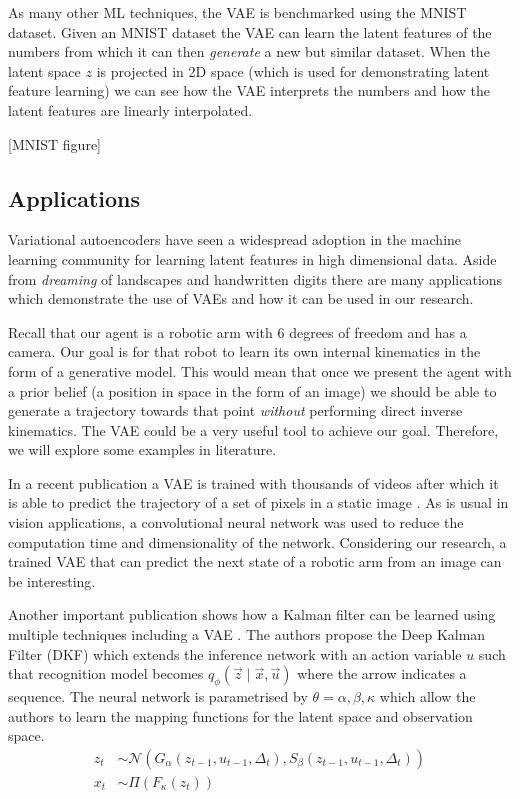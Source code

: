 \documentclass[main.tex]{subfiles}
\begin{document}
As many other ML techniques, the VAE is benchmarked using the MNIST dataset. Given an MNIST dataset the VAE can learn the latent features of the numbers from which it can then \textit{generate} a new but similar dataset. When the latent space $z$ is projected in 2D space (which is used for demonstrating latent feature learning) we can see how the VAE interprets the numbers and how the latent features are linearly interpolated.

[MNIST figure]

\subsection{Applications}
Variational autoencoders have seen a widespread adoption in the machine learning community for learning latent features in high dimensional data. Aside from \textit{dreaming} of landscapes and handwritten digits there are many applications which demonstrate the use of VAEs and how it can be used in our research.

Recall that our agent is a robotic arm with 6 degrees of freedom and has a camera. Our goal is for that robot to learn its own internal kinematics in the form of a generative model. This would mean that once we present the agent with a prior belief (a position in space in the form of an image) we should be able to generate a trajectory towards that point \textit{without} performing direct inverse kinematics. The VAE could be a very useful tool to achieve our goal. Therefore, we will explore some examples in literature. 

In a recent publication a VAE is trained with thousands of videos after which it is able to predict the trajectory of a set of pixels in a static image \cite{walker2016uncertain}. As is usual in vision applications, a convolutional neural network was used to reduce the computation time and dimensionality of the network. Considering our research, a trained VAE that can predict the next state of a robotic arm from an image can be interesting. 

Another important publication shows how a Kalman filter can be learned using multiple techniques including a VAE \cite{krishnan2015deep}. The authors propose the Deep Kalman Filter (DKF) which extends the inference network with an action variable $u$ such that recognition model becomes $q_\phi(\vec{z} \mid \vec{x}, \vec{u})$ where the arrow indicates a sequence. The neural network is parametrised by $\theta = {\alpha, \beta, \kappa}$ which allow the authors to learn the mapping functions for the latent space and observation space.
\begin{equation}
  \label{eq:deep_kalman}
  \begin{split}
  z_t &\sim \mathcal{N}\left(G_\alpha (z_{t-1}, u_{t-1},\Delta_t), S_\beta(z_{t-1}, u_{t-1},\Delta_t) \right) \\
  x_t &\sim \Pi\left(F_\kappa(z_t)\right)
  \end{split}
\end{equation}
\end{document}
